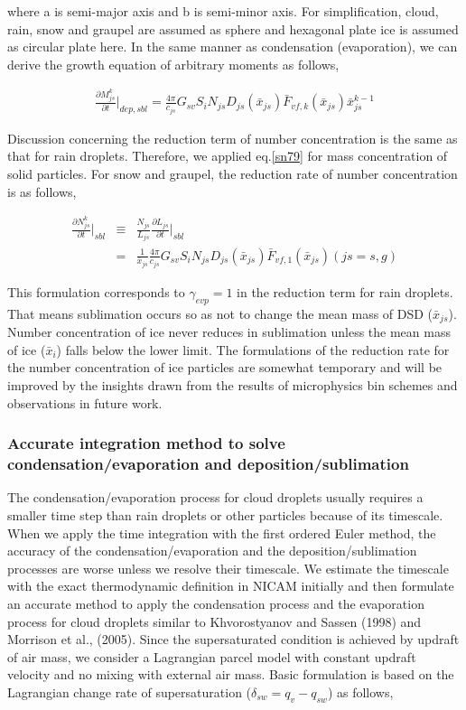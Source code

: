 where a is semi-major axis and b is semi-minor axis. For simplification, cloud, rain, snow and graupel are assumed as sphere and hexagonal plate ice is assumed as circular plate here. In the same manner as condensation (evaporation), we can derive the growth equation of arbitrary moments as follows,

\begin{eqnarray}
\frac{\partial M_{js}^{k}}{\partial t}\Bigr|_{dep,sbl}=\frac{4\pi}{c_{js}}G_{sv}S_{i}N_{js}D_{js}(\bar{x}_{js})\bar{F}_{vf,k}(\bar{x}_{js})\bar{x}_{js}^{k-1}\label{sn79}
\end{eqnarray}

Discussion concerning the reduction term of number concentration is the same as that for rain droplets. Therefore, we applied eq.\ref{sn79} for mass concentration of solid particles. For snow and graupel, the reduction rate of number concentration is as follows,

\begin{eqnarray}
\frac{\partial N_{js}^{k}}{\partial t}\Bigr|_{sbl}&\equiv&\frac{N_{js}}{L_{js}}\frac{\partial L_{js}}{\partial t}\Bigr|_{sbl}\nonumber\\
&=&\frac{1}{\bar{x}_{js}}\frac{4\pi}{c_{js}}G_{sv}S_{i}N_{js}D_{js}(\bar{x}_{js})\bar{F}_{vf,1}(\bar{x}_{js})(js=s,g)\label{sn80}
\end{eqnarray}

This formulation corresponds to $\gamma_{evp} = 1$ in the reduction term for rain droplets. That means sublimation occurs so as not to change the mean mass of DSD ($\bar{x}_{js}$). Number concentration of ice never reduces in sublimation unless the mean mass of ice ($\bar{x}_{i}$) falls below the lower limit. The formulations of the reduction rate for the number concentration of ice particles are somewhat temporary and will be improved by the insights drawn from the results of microphysics bin schemes and observations in future work.

\subsubsection{Accurate integration method to solve condensation/evaporation and deposition/sublimation}
The condensation/evaporation process for cloud droplets usually requires a smaller time step than rain droplets or other particles because of its timescale. When we apply the time integration with the first ordered Euler method, the accuracy of the condensation/evaporation and the deposition/sublimation processes are worse unless we resolve their timescale. We estimate the timescale with the exact thermodynamic definition in NICAM initially and then formulate an accurate method to apply the condensation process and the evaporation process for cloud droplets similar to Khvorostyanov and Sassen (1998) and Morrison et al., (2005). Since the supersaturated condition is achieved by updraft of air mass, we consider a Lagrangian parcel model with constant updraft velocity and no mixing with external air mass. Basic formulation is based on the Lagrangian change rate of supersaturation ($\delta_{sw} = q_{v} - q_{sw}$) as follows,

